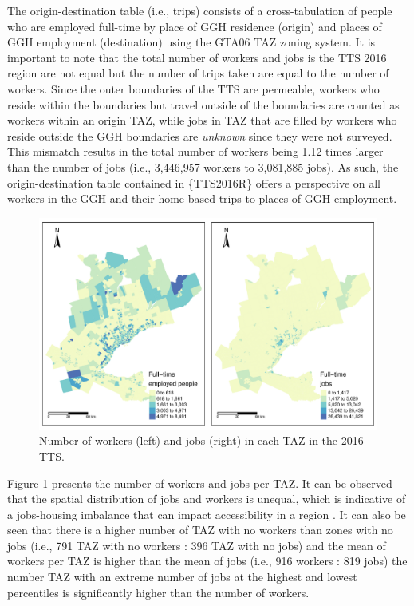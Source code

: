 \documentclass[Royal,times,sageh]{sagej}
\begin{document}
The origin-destination table (i.e., trips) consists of a
cross-tabulation of people who are employed full-time by place of GGH
residence (origin) and places of GGH employment (destination) using the
GTA06 TAZ zoning system. It is important to note that the total number
of workers and jobs is the TTS 2016 region are not equal but the number
of trips taken are equal to the number of workers. Since the outer
boundaries of the TTS are permeable, workers who reside within the
boundaries but travel outside of the boundaries are counted as workers
within an origin TAZ, while jobs in TAZ that are filled by workers who
reside outside the GGH boundaries are \emph{unknown} since they were not
surveyed. This mismatch results in the total number of workers being
1.12 times larger than the number of jobs (i.e., 3,446,957 workers to
3,081,885 jobs). As such, the origin-destination table contained in
\{TTS2016R\} offers a perspective on all workers in the GGH and their
home-based trips to places of GGH employment.

\begin{figure}
\includegraphics[width=1\linewidth]{Manuscript-Data-Package_files/figure-latex/tts-workers-jobs-plot-1} \caption{\label{fig:tts-workers-jobs-plot}Number of workers (left) and jobs (right) in each TAZ in the 2016 TTS.}\label{fig:tts-workers-jobs-plot}
\end{figure}

Figure \ref{fig:tts-workers-jobs-plot} presents the number of workers
and jobs per TAZ. It can be observed that the spatial distribution of
jobs and workers is unequal, which is indicative of a jobs-housing
imbalance that can impact accessibility in a region
\citep{Levine1998rethinking}. It can also be seen that there is a higher
number of TAZ with no workers than zones with no jobs (i.e., 791 TAZ
with no workers : 396 TAZ with no jobs) and the mean of workers per TAZ
is higher than the mean of jobs (i.e., 916 workers : 819 jobs) the
number TAZ with an extreme number of jobs at the highest and lowest
percentiles is significantly higher than the number of workers.
\end{document}
